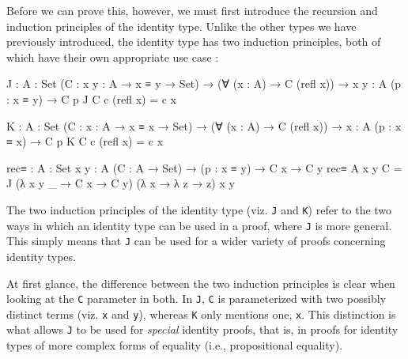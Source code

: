 \documentclass[12pt]{article}
\begin{document}
Before we can prove this, however, we must first introduce the recursion and
induction principles of the identity type. Unlike the other types we have
previously introduced, the identity type has two induction principles, both of
which have their own appropriate use case \cite{}:
\begin{center}
\begin{minipage}{0.9\textwidth}
\begin{code}
J : {A : Set} (C : {x y : A} → x ≡ y → Set) →
    (∀ (x : A) → C (refl x)) →
    {x y : A} (p : x ≡ y) → C p
J C c (refl x) = c x

K : {A : Set} (C : {x : A} → x ≡ x → Set) →
    (∀ (x : A) → C (refl x)) →
    {x : A} (p : x ≡ x) → C p
K C c (refl x) = c x

rec≡ : {A : Set} {x y : A} (C : A → Set) →
       (p : x ≡ y) → C x → C y
rec≡ {A} {x} {y} C = 
  J (λ {x} {y} _ → C x → C y)
    (λ x → λ z → z)
    {x} {y} 
\end{code}
\end{minipage}
\end{center}
The two induction principles of the identity type (viz. {\tt J} and {\tt K})
refer to the two ways in which an identity type can be used in a proof, where
{\tt J} is more general. This simply means that {\tt J} can be used for a wider
variety of proofs concerning identity types.

At first glance, the difference between the two induction principles is clear
when looking at the {\tt C} parameter in both. In {\tt J}, {\tt C} is
parameterized with two possibly distinct terms (viz. {\tt x} and {\tt y}),
whereas {\tt K} only mentions one, {\tt x}. This distinction is what allows
{\tt J} to be used for {\em special} identity proofs, that is, in proofs
for identity types of more complex forms of equality (i.e., propositional
equality).
\end{document}
